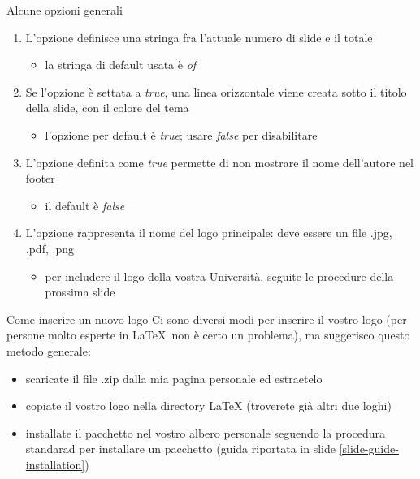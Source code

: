 \begin{tframe}{Alcune opzioni generali}
\begin{enumerate}
\item L'opzione  definisce una stringa fra l'attuale numero di slide e il totale
  \begin{itemize}
  \item la stringa di default usata è \emph{of}
  \end{itemize}
\item Se l'opzione  è settata a \emph{true}, una linea orizzontale viene creata sotto il titolo della slide, con il colore del tema
\begin{itemize}
  \item l'opzione per default è \emph{true}; usare \emph{false} per disabilitare
\end{itemize}
\item L'opzione  definita come \emph{true} permette di non mostrare il nome dell'autore nel footer
\begin{itemize}
\item il default è \emph{false}
\end{itemize}
\item L'opzione  rappresenta il nome del logo principale: deve essere un file .jpg, .pdf, .png
\begin{itemize}
\item per includere il logo della vostra Università, seguite le procedure della prossima slide
\end{itemize}
\end{enumerate}
\end{tframe}

\begin{tframe}{Come inserire un nuovo logo}
Ci sono diversi modi per inserire il vostro logo (per persone molto esperte in \LaTeX\, non è certo un problema), ma suggerisco questo metodo generale:
\begin{itemize}
\item scaricate il file .zip dalla mia pagina personale ed estraetelo
\item copiate il vostro logo nella directory LaTeX (troverete già altri due loghi)
\item installate il pacchetto nel vostro albero personale seguendo la procedura standarad per installare un pacchetto (guida riportata in slide \ref{slide-guide-installation})
\end{itemize}
\label{slide-rule-installation}
\end{tframe}

